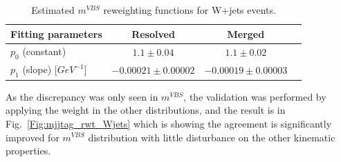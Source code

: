 \begin{table}[!h]
	\caption{Estimated $m^{VBS}$ reweighting functions for W+jets events.}
	\label{tab:reweighting_summary_Wjets}
	\centering
	\begin{tabular}{lccc}
		\hline
		Fitting parameters            & Resolved             & Merged   \\
		\hline
		$p_0$ (constant)              & $ 1.1 \pm 0.04 $       &  $ 1.1 \pm 0.02 $    \\
		$p_1$ (slope) [$GeV^{-1}$]    & $ -0.00021 \pm 0.00002 $ &  $ -0.00019 \pm 0.00003 $  \\
		\hline
	\end{tabular}
\end{table}
As the discrepancy was only seen in $m^{VBS}$, the validation was performed by applying the weight in the other distributions, and the result is in Fig.~\ref{Fig:mjjtag_rwt_Wjets} which is showing the agreement is significantly improved for $m^{VBS}$ distribution with little disturbance on the other kinematic properties.
